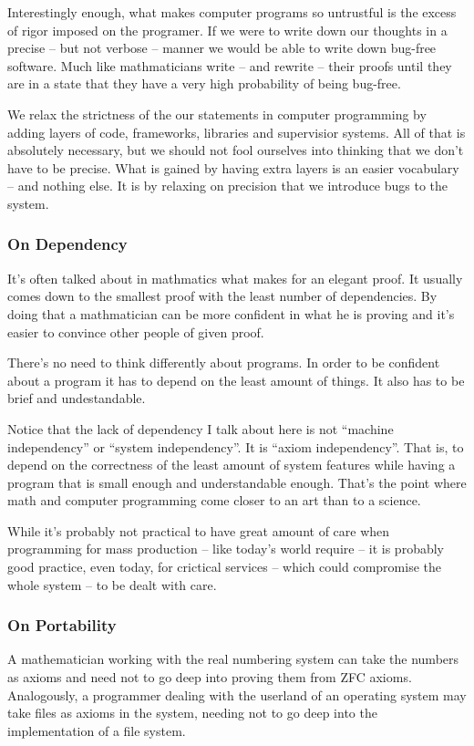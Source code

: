 \documentclass{article}
\begin{document}
Interestingly enough, what makes computer programs so untrustful is the excess
of rigor imposed on the programer. If we were to write down our thoughts in a
precise -- but not verbose -- manner we would be able to write down bug-free
software. Much like mathmaticians write -- and rewrite -- their proofs until
they are in a state that they have a very high probability of being bug-free.

We relax the strictness of the our statements in computer programming by adding
layers of code, frameworks, libraries and supervisior systems. All of that is
absolutely necessary, but we should not fool ourselves into thinking that we
don't have to be precise. What is gained by having extra layers is an easier
vocabulary -- and nothing else. It is by relaxing on precision that we introduce
bugs to the system.

\subsubsection{On Dependency}
It's often talked about in mathmatics what makes for an elegant proof. It
usually comes down to the smallest proof with the least number of dependencies.
By doing that a mathmatician can be more confident in what he is proving and
it's easier to convince other people of given proof.

There's no need to think differently about programs. In order to be confident
about a program it has to depend on the least amount of things. It also has to
be brief and undestandable.

Notice that the lack of dependency I talk about here is not ``machine
independency'' or ``system independency''. It is ``axiom independency''. That
is, to depend on the correctness of the least amount of system features while
having a program that is small enough and understandable enough. That's the
point where math and computer programming come closer to an art than to a
science.

While it's probably not practical to have great amount of care when programming
for mass production -- like today's world require -- it is probably good
practice, even today, for crictical services -- which could compromise the whole
system -- to be dealt with care.

\subsubsection{On Portability}
A mathematician working with the real numbering system can take the
numbers as axioms and need not to go deep into proving them from ZFC axioms.
Analogously, a programmer dealing with the userland of an operating system may
take files as axioms in the system, needing not to go deep into the
implementation of a file system.
\end{document}
